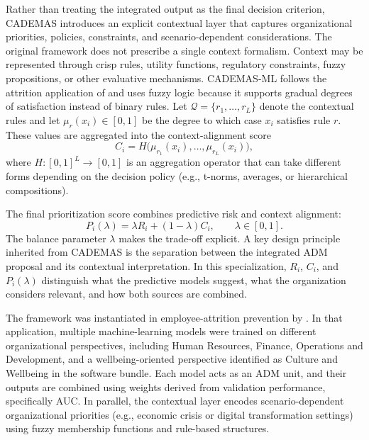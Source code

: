 \documentclass{interact}
\begin{document}
Rather than treating the integrated output as the final decision criterion, CADEMAS introduces an explicit contextual layer that captures organizational priorities, policies, constraints, and scenario-dependent considerations. The original framework does not prescribe a single context formalism. Context may be represented through crisp rules, utility functions, regulatory constraints, fuzzy propositions, or other evaluative mechanisms. CADEMAS-ML follows the attrition application of \citet{Godz2026} and uses fuzzy logic because it supports gradual degrees of satisfaction instead of binary rules. Let $\mathcal{Q}=\{r_1,\ldots,r_L\}$ denote the contextual rules and let $\mu_r(x_i)\in[0,1]$ be the degree to which case $x_i$ satisfies rule $r$. These values are aggregated into the context-alignment score
\begin{equation}
C_i = H\big(\mu_{r_1}(x_i), \dots, \mu_{r_L}(x_i)\big),
\end{equation}
where $H: [0,1]^L \rightarrow [0,1]$ is an aggregation operator that can take different forms depending on the decision policy (e.g., t-norms, averages, or hierarchical compositions).

The final prioritization score combines predictive risk and context alignment:
\begin{equation}
P_i(\lambda)=\lambda R_i+(1-\lambda)C_i,\qquad \lambda\in[0,1].
\end{equation}
The balance parameter $\lambda$ makes the trade-off explicit. A key design principle inherited from CADEMAS is the separation between the integrated ADM proposal and its contextual interpretation. In this specialization, $R_i$, $C_i$, and $P_i(\lambda)$ distinguish what the predictive models suggest, what the organization considers relevant, and how both sources are combined.

The framework was instantiated in employee-attrition prevention by \citet{Godz2026}. In that application, multiple machine-learning models were trained on different organizational perspectives, including Human Resources, Finance, Operations and Development, and a wellbeing-oriented perspective identified as Culture and Wellbeing in the software bundle. Each model acts as an ADM unit, and their outputs are combined using weights derived from validation performance, specifically AUC. In parallel, the contextual layer encodes scenario-dependent organizational priorities (e.g., economic crisis or digital transformation settings) using fuzzy membership functions and rule-based structures.
\end{document}
